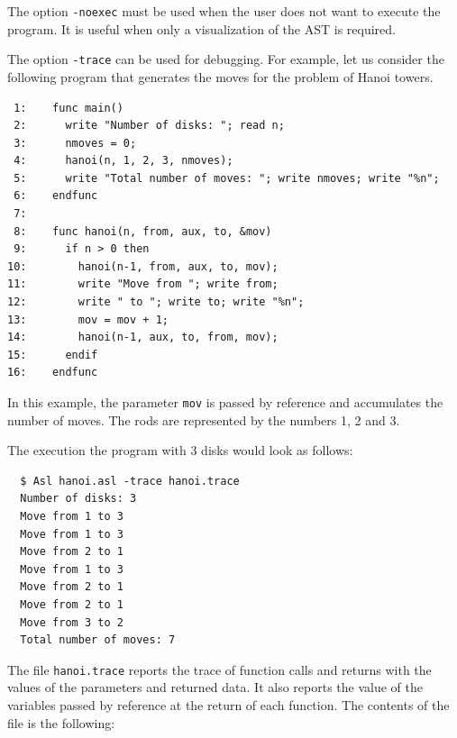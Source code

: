The option \texttt{-noexec} must be used when the user does not want
to execute the program. It is useful when only a visualization of the AST is
required.

The option \texttt{-trace} can be used for debugging. For example, let us
consider the following program that generates the moves for the problem of
Hanoi towers.

\begin{verbatim}
 1:    func main()
 2:      write "Number of disks: "; read n;
 3:      nmoves = 0;
 4:      hanoi(n, 1, 2, 3, nmoves);
 5:      write "Total number of moves: "; write nmoves; write "%n";
 6:    endfunc
 7:
 8:    func hanoi(n, from, aux, to, &mov)
 9:      if n > 0 then
10:        hanoi(n-1, from, aux, to, mov);
11:        write "Move from "; write from;
12:        write " to "; write to; write "%n";
13:        mov = mov + 1;
14:        hanoi(n-1, aux, to, from, mov);
15:      endif
16:    endfunc
\end{verbatim}

In this example, the parameter \texttt{mov} is passed by reference and
accumulates the number of moves. The rods are represented by the numbers 1, 2
and 3.

The execution the program with 3 disks would look as follows:

\begin{verbatim}
  $ Asl hanoi.asl -trace hanoi.trace 
  Number of disks: 3
  Move from 1 to 3
  Move from 1 to 3
  Move from 2 to 1
  Move from 1 to 3
  Move from 2 to 1
  Move from 2 to 1
  Move from 3 to 2
  Total number of moves: 7
\end{verbatim}

The file \texttt{hanoi.trace} reports the trace of function calls
and returns with the values of the parameters and returned data.
It also reports the value of the variables passed by reference
at the return of each function. The contents of the file is the following:

